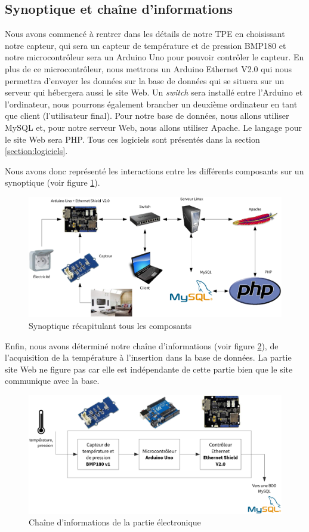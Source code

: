 \subsection{Synoptique et chaîne d'informations}

Nous avons commencé à rentrer dans les détails de notre TPE en choisissant notre capteur, qui sera un capteur de température et de pression BMP180 et notre microcontrôleur sera un Arduino Uno pour pouvoir contrôler le capteur. En plus de ce microcontrôleur, nous mettrons un Arduino Ethernet V2.0 qui nous permettra d'envoyer les données sur la base de données qui se situera sur un serveur qui hébergera aussi le site Web. Un \emph{switch} sera installé entre l'Arduino et l'ordinateur, nous pourrons également brancher un deuxième ordinateur en tant que client (l'utilisateur final). Pour notre base de données, nous allons utiliser MySQL et, pour notre serveur Web, nous allons utiliser Apache. Le langage pour le site Web sera PHP. Tous ces logiciels sont présentés dans la section \ref{section:logiciels}.

Nous avons donc représenté les interactions entre les différents composants sur un synoptique (voir figure \ref{figure:synoptique}).

\begin{figure}[!h]
	\centering
	\includegraphics[width=.9\linewidth]{Images/Synoptique}
	\caption{Synoptique récapitulant tous les composants}
	\label{figure:synoptique}
\end{figure}

Enfin, nous avons déterminé notre chaîne d'informations (voir figure \ref{figure:ci}), de l'acquisition de la température à l'insertion dans la base de données. La partie site Web ne figure pas car elle est indépendante de cette partie bien que le site communique avec la base.

\begin{figure}[!h]
	\centering
	\includegraphics[width=.9\linewidth]{Images/Chaine_information}
	\caption{Chaîne d'informations de la partie électronique}
	\label{figure:ci}
\end{figure}
